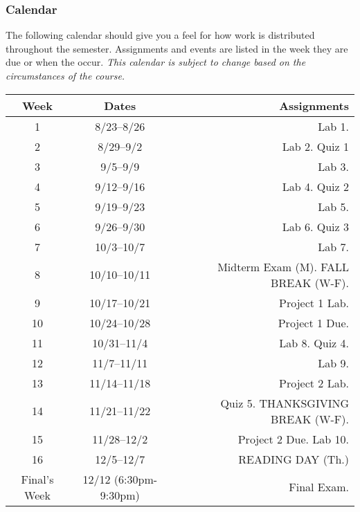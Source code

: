 \documentclass[10pt]{article}
\begin{document}
\subsubsection{Calendar}

The following calendar should give you a feel for how work is distributed throughout the semester.  Assignments and events are listed in the week they are due or when the occur. \textit{This calendar is subject to change based on the circumstances of the course.}

\begin{center}
\begin{tabular}{ccr}
\toprule
Week & Dates & Assignments \\
\toprule
1 & 8/23--8/26 &  Lab 1.\\
2 & 8/29--9/2 &   Lab 2. Quiz 1\\
3 & 9/5--9/9 &   Lab 3. \\
4 & 9/12--9/16 &  Lab 4. Quiz 2\\
5 & 9/19--9/23 &  Lab 5.\\
6 & 9/26--9/30  &  Lab 6. Quiz 3\\
7 & 10/3--10/7 &  Lab 7.\\
8 & 10/10--10/11 & Midterm Exam (M).  FALL BREAK (W-F). \\
9 & 10/17--10/21 &  Project 1 Lab. \\
10 & 10/24--10/28 & Project 1 Due. \\
11 & 10/31--11/4 &  Lab 8. Quiz 4.\\
12 & 11/7--11/11 & Lab 9. \\
13 & 11/14--11/18 &  Project 2 Lab.\\
14 & 11/21--11/22 &   Quiz 5. THANKSGIVING BREAK (W-F).  \\
15 & 11/28--12/2 &  Project 2 Due. Lab 10. \\
16 & 12/5--12/7 &  READING DAY (Th.) \\
\midrule
Final's Week & 12/12 (6:30pm-9:30pm) & Final Exam. \\
\bottomrule
\end{tabular}
\end{center}
\end{document}
